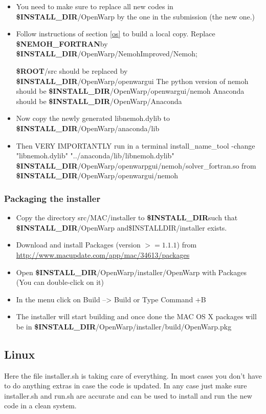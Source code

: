 \documentclass[12pt]{article}
\newcommand{\ROOT}{{\textbf{\$ROOT}}}
\newcommand{\NEMOHFORTRAN}{{\textbf{\$NEMOH{\_}FORTRAN}}}
\newcommand{\INSTALLDIR}{{\textbf{\$INSTALL{\_}DIR}}}
\begin{document}
\begin{itemize}
	
	 	\item You need to make sure to replace all new codes in \INSTALLDIR/OpenWarp by the one in the submission (the new one.)
	 	\item Follow instructions of section \ref*{os} to build a local copy.
	 	Replace \NEMOHFORTRAN by \INSTALLDIR/OpenWarp/NemohImproved/Nemoh;
	 	
	 	\ROOT/src should be replaced by \INSTALLDIR/OpenWarp/openwargui
	 	The python version of nemoh should be \INSTALLDIR/OpenWarp/openwargui/nemoh Anaconda should be \INSTALLDIR/OpenWarp/Anaconda
 \item Now copy the newly generated libnemoh.dylib to \INSTALLDIR/OpenWarp/anaconda/lib
\item Then {\color{red} VERY IMPORTANTLY} run in a terminal
 {\color{blue} install{\_}name{\_}tool -change "libnemoh.dylib" "../anaconda/lib/libnemoh.dylib" \INSTALLDIR/OpenWarp/openwarpgui/nemoh/solver{\_}fortran.so}  from \INSTALLDIR/OpenWarp/openwargui/nemoh
	
\end{itemize}

\subsubsection{Packaging the installer}

\begin{itemize}
	\item Copy the directory src/MAC/installer to \INSTALLDIR such that \INSTALLDIR/OpenWarp and\$INSTALLDIR/installer exists.
\item Download and install Packages (version $>= 1.1.1$) from \url{http://www.macupdate.com/app/mac/34613/packages}
\item Open \INSTALLDIR/OpenWarp/installer/OpenWarp with Packages (You can double-click on it)
\item In the menu click on Build --> Build or Type Command +B
\item The installer will start building and once done the MAC OS X packages will be in \INSTALLDIR/OpenWarp/installer/build/OpenWarp.pkg
\end{itemize}

\subsection{Linux}

Here the file installer.sh is taking care of everything. In most cases you don't have to do anything extras in case the code is updated. In any case just make sure installer.sh and run.sh are accurate and can be used to install and run the new code in a clean system.
\end{document}
